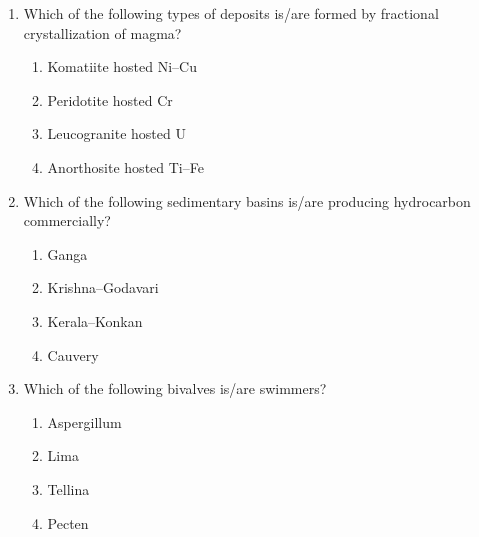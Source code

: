 \documentclass[journal,12pt,onecolumn]{IEEEtran}
\begin{document}
\begin{enumerate}
\begin{multicols}{2}
\begin{enumerate}
\item Bijli → Rajmahal → Malani → Deccan
\item Malani → Bijli → Deccan → Rajmahal
\item Bijli → Malani → Rajmahal → Deccan
\item Malani → Rajmahal → Bijli → Deccan
\end{enumerate}
\end{multicols}

\item Which of the following types of deposits is/are formed by fractional crystallization of magma?  

\hfill{}

\begin{multicols}{2}
\begin{enumerate}
\item Komatiite hosted Ni–Cu
\item Peridotite hosted Cr
\item Leucogranite hosted U
\item Anorthosite hosted Ti–Fe
\end{enumerate}
\end{multicols}

\item Which of the following sedimentary basins is/are producing hydrocarbon commercially?  

\hfill{}

\begin{multicols}{2}
\begin{enumerate}
\item Ganga
\item Krishna–Godavari
\item Kerala–Konkan
\item Cauvery
\end{enumerate}
\end{multicols}

\item Which of the following bivalves is/are swimmers?  

\hfill{}

\begin{multicols}{2}
\begin{enumerate}
\item Aspergillum
\item Lima
\item Tellina
\item Pecten
\end{enumerate}
\end{multicols}


\end{enumerate}
\end{document}
